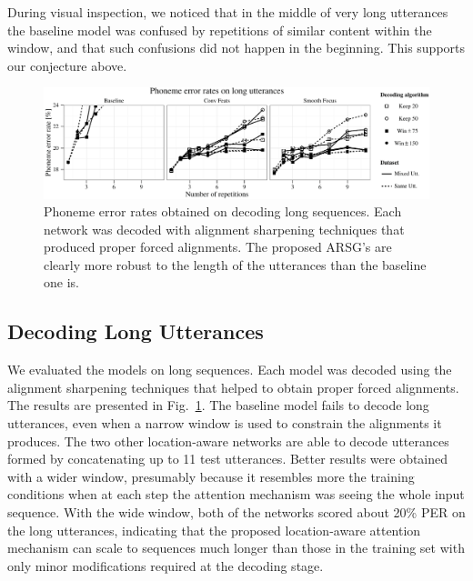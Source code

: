 \documentclass{article} %
\begin{document}
During visual inspection, we noticed that in the middle of very long utterances
the baseline model was confused by repetitions of similar content within the
window, and that such confusions did not happen in the beginning. This supports
our conjecture above.


\begin{figure}[t]
  \centering
  \includegraphics[width=\textwidth]{decode_longs}
  \caption[Phoneme error rates obtained on decoding long sequences.]{ 
      Phoneme error rates obtained on decoding long sequences. Each network was
      decoded with alignment sharpening techniques that produced proper forced
      alignments. The proposed ARSG's are clearly more robust to the length of
      the utterances than the baseline one is.
  }
  \label{fig:decoding_longs}

  \vspace{-4mm}
\end{figure}

\subsection{Decoding Long Utterances}

We evaluated the models on long sequences. Each model was decoded using the
alignment sharpening techniques that helped to obtain proper forced alignments.
The results are presented in Fig.~\ref{fig:decoding_longs}. The baseline model
fails to decode long utterances, even when a narrow window is used to constrain
the alignments it produces. The two other location-aware networks 
are able to decode utterances formed by concatenating up to 11 test utterances.
Better results were obtained with a wider window, presumably because it
resembles more the training conditions when at each step the attention mechanism
was seeing the whole input sequence.  With the wide window, both of the networks
scored about 20\% PER on the long utterances, indicating that the proposed
location-aware attention mechanism can scale to sequences much longer than those
in the training set with only minor modifications required at the decoding
stage.
\end{document}
